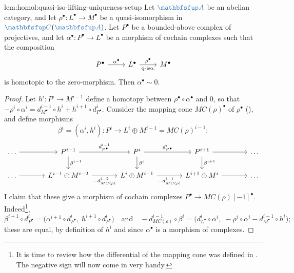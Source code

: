 \begin{lem}{}{lem:homol:quasi-iso-lifting-uniqueness-setup}
  Let $\categ{A}$ be an abelian category, and let
  $\rho^\bullet : L^\bullet \to M^\bullet$ be a quasi-isomorphism in
  $\categ{C}(\categ{A})$. Let $P^\bullet$ be a bounded-above complex
  of projectives, and let $\alpha^\bullet : P^\bullet \to L^\bullet$
  be a morphism of cochain complexes such that the composition
  \[\begin{tikzcd}
      P^\bullet \arrow[r, "\alpha^\bullet"] & L^\bullet \arrow[r,
      "\rho^\bullet", "\text{q-iso.}"'] & M^\bullet
    \end{tikzcd}\] is homotopic to the zero-morphism. Then
  $\alpha^\bullet \sim 0$.
\end{lem}
\begin{proof}
  Let $h^i : P^i \to M^{i-1}$ define a homotopy between
  $\rho^\bullet \circ \alpha^\bullet$ and $0$, so that
  $-\rho^i \circ \alpha^i = d^{i-1}_{M^\bullet} \circ h^i + h^{i+1}
  \circ d^i_{P^\bullet}$.  Consider the mapping cone
  $MC(\rho)^\bullet$ of $\rho^\bullet$
  (), and define
  morphisms
  \[
    \beta^i = (\alpha^i, h^i) : P^i \to L^i \oplus M^{i-1} =
    MC(\rho)^{i-1}:
  \]
  \[\begin{tikzcd}[column sep=large]
      \dots \arrow[r] & P^{i-1} \arrow[r, "d_{P^\bullet}^{i-1}"]
      \arrow[d, "\beta^{i-1}"] & P^i \arrow[r, "d_{P^\bullet}^i"]
      \arrow[d, "\beta^i"] &
      P^{i+1} \arrow[r] \arrow[d, "\beta^{i+1}"] & \dots \\
      \dots \arrow[r] & L^{i-1} \oplus M^{i-2} \arrow[r,
      "-d_{MC(\rho)}^{i-2}"'] & L^i \oplus M^{i-1} \arrow[r,
      "-d_{MC(\rho)}^{i-1}"'] & L^{i+1} \oplus M^i \arrow[r] & \dots
    \end{tikzcd}\] I claim that these give a morphism of cochain
  complexes $P^\bullet \to MC(\rho)[-1]^\bullet$. Indeed\footnote{It
    is time to review how the differential of the mapping cone was
    defined in
    . The
    negative sign will now come in very handy.},
  \[
    \beta^{i+1} \circ d^i_{P^\bullet} = \bigl(\alpha^{i+1} \circ
    d^i_{P^\bullet},\; h^{i+1} \circ d^i_{P^\bullet}\bigr) \quad
    \text{and} \quad -d^{i-1}_{MC(\rho)} \circ \beta^i =
    \bigl(d^i_{L^\bullet} \circ \alpha^i,\; -\rho^i \circ \alpha^i -
    d^{i-1}_{M^\bullet} \circ h^i\bigr);
  \]
  these are equal, by definition of $h^i$ and since $\alpha^\bullet$
  is a morphism of complexes.


\end{proof}
